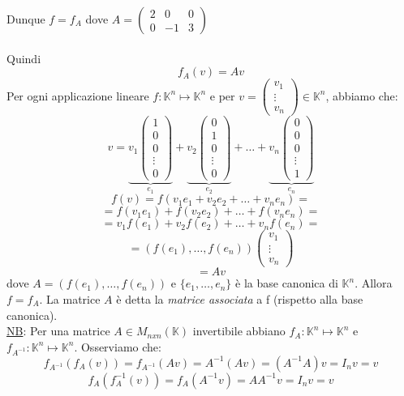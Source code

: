 \documentclass[12pt]{article}
\begin{document}
Dunque $f = f_A$ dove $A = \begin{pmatrix}
    2 & 0 & 0\\
    0 & -1 & 3
\end{pmatrix}$
\\\\
Quindi
\[f_A(v) = Av\]
Per ogni applicazione lineare $f: \mathbb{K}^n \mapsto \mathbb{K}^n$ e per $v = \begin{pmatrix}
    v_1\\
    \vdots\\
    v_n
\end{pmatrix} \in \mathbb{K}^n$, abbiamo che:
\[v = \underbrace{v_1\begin{pmatrix}
    1\\
    0\\
    0\\
    \vdots\\
    0
\end{pmatrix}}_{e_1} + \underbrace{v_2\begin{pmatrix}
    0\\
    1\\
    0\\
    \vdots\\
    0
\end{pmatrix}}_{e_2} + \dots + \underbrace{v_n \begin{pmatrix}
    0\\
    0\\
    0\\
    \vdots\\
    1
\end{pmatrix}}_{e_n}\]
\[f(v) = f(v_1e_1 + v_2e_2 + \dots + v_ne_n) = \]
\[= f(v_1e_1) + f(v_2e_2) + \dots + f(v_ne_n) = \]
\[= v_1f(e_1) + v_2f(e_2) + \dots + v_nf(e_n) =\]
\[= (f(e_1), \dots, f(e_n)) \begin{pmatrix}
    v_1\\
    \vdots\\
    v_n
\end{pmatrix}\]
\[= Av\]
dove $A = (f(e_1), \dots, f(e_n))$ e $\{e_1, \dots, e_n\}$ è la base canonica di $\mathbb{K}^n$. Allora $f=f_A$. La matrice $A$ è detta la \textit{matrice associata} a f (rispetto alla base canonica).
\\
\underline{NB}: Per una matrice $A \in M_{nxn}(\mathbb{K})$ invertibile abbiano $f_A: \mathbb{K}^n \mapsto \mathbb{K}^n$ e $f_{A^{-1}}: \mathbb{K}^n \mapsto \mathbb{K}^n$. Osserviamo che:
\[f_{A^{-1}}(f_A(v)) = f_{A^{-1}}(Av) = A^{-1}(Av) = (A^{-1}A)v = I_nv = v\]
\[f_A(f_A^{-1}(v)) = f_{A}(A^{-1}v) = AA^{-1}v = I_nv = v\]
\end{document}
